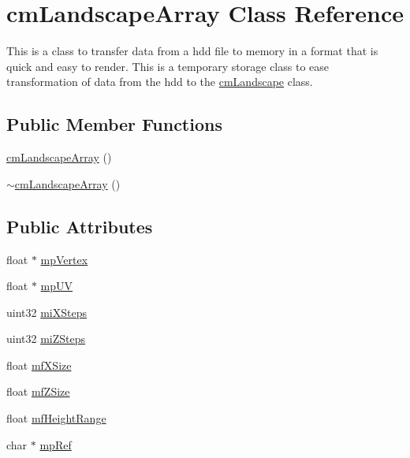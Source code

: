 \hypertarget{classcm_landscape_array}{
\section{cmLandscapeArray Class Reference}
\label{classcm_landscape_array}
}


This is a class to transfer data from a hdd file to memory in a format that is quick and easy to render. This is a temporary storage class to ease transformation of data from the hdd to the \hyperlink{classcm_landscape}{cmLandscape} class.  


\subsection*{Public Member Functions}
\begin{DoxyCompactItemize}
\item 
\hyperlink{classcm_landscape_array_a1d8ba3a4a22592278c28af22f20bdb6d}{cmLandscapeArray} ()
\item 
\hyperlink{classcm_landscape_array_ace5036132ea4864ac3c71ad2c59915f0}{$\sim$cmLandscapeArray} ()
\end{DoxyCompactItemize}
\subsection*{Public Attributes}
\begin{DoxyCompactItemize}
\item 
float $\ast$ \hyperlink{classcm_landscape_array_a1f26895155bdad61142e775187372840}{mpVertex}
\item 
float $\ast$ \hyperlink{classcm_landscape_array_a3c409cb07dfa1fbbf19c33c9ca85487b}{mpUV}
\item 
uint32 \hyperlink{classcm_landscape_array_ac12e8c5ad15c0d58ef5ceed7781ff8a4}{miXSteps}
\item 
uint32 \hyperlink{classcm_landscape_array_ad3fa0c26a0b1ad0e39f9038d963ede9b}{miZSteps}
\item 
float \hyperlink{classcm_landscape_array_a207de95dc2e9c858f46d2b2eb974c084}{mfXSize}
\item 
float \hyperlink{classcm_landscape_array_a073dfe447fd51f39c73886b8f86cd997}{mfZSize}
\item 
float \hyperlink{classcm_landscape_array_af7df49136ba8e4a93fc38ff565a1369c}{mfHeightRange}
\item 
char $\ast$ \hyperlink{classcm_landscape_array_ac087951431be014c2fd42635422aca54}{mpRef}
\end{DoxyCompactItemize}



